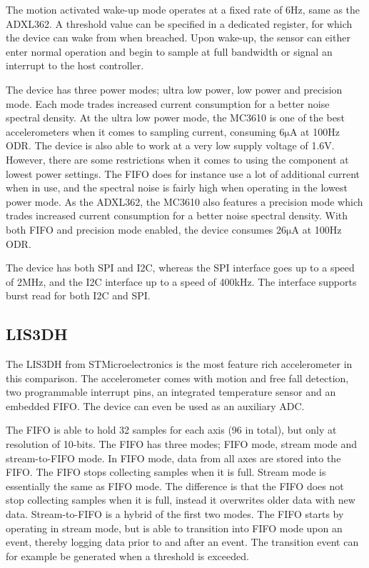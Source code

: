 The motion activated wake-up mode operates at a fixed rate of 6Hz, same as the ADXL362. A threshold value can be specified in a dedicated register, for which the device can wake from when breached. Upon wake-up, the sensor can either enter normal operation and begin to sample at full bandwidth or signal an interrupt to the host controller.

The device has three power modes; ultra low power, low power and precision mode. Each mode trades increased current consumption for a better noise spectral density. At the ultra low power mode, the MC3610 is one of the best accelerometers when it comes to sampling current, consuming 6$\si{\micro\ampere}$ at 100Hz ODR. The device is also able to work at a very low supply voltage of 1.6V. However, there are some restrictions when it comes to using the component at lowest power settings. The FIFO does for instance use a lot of additional current when in use, and the spectral noise is fairly high when operating in the lowest power mode. As the ADXL362, the MC3610 also features a precision mode which trades increased current consumption for a better noise spectral density. With both FIFO and precision mode enabled, the device consumes 26$\si{\micro\ampere}$ at 100Hz ODR. 

The device has both SPI and I2C, whereas the SPI interface goes up to a speed of 2MHz, and the I2C interface up to a speed of 400kHz. The interface supports burst read for both I2C and SPI.

\subsection{LIS3DH}

The LIS3DH from STMicroelectronics is the most feature rich accelerometer in this comparison. The accelerometer comes with motion and free fall detection, two programmable interrupt pins, an integrated temperature sensor and an embedded FIFO. The device can even be used as an auxiliary ADC.

The FIFO is able to hold 32 samples for each axis (96 in total), but only at resolution of 10-bits. The FIFO has three modes; FIFO mode, stream mode and stream-to-FIFO mode. In FIFO mode, data from all axes are stored into the FIFO. The FIFO stops collecting samples when it is full. Stream mode is essentially the same as FIFO mode. The difference is that the FIFO does not stop collecting samples when it is full, instead it overwrites older data with new data. Stream-to-FIFO is a hybrid of the first two modes. The FIFO starts by operating in stream mode, but is able to transition into FIFO mode upon an event, thereby logging data prior to and after an event. The transition event can for example be generated when a threshold is exceeded.

